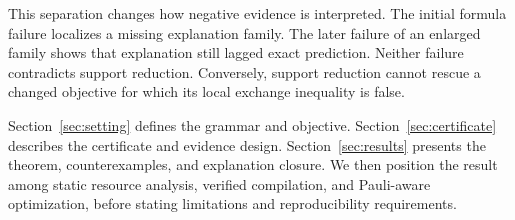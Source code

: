 This separation changes how negative evidence is interpreted. The initial formula failure localizes a missing explanation family. The later failure of an enlarged family shows that explanation still lagged exact prediction. Neither failure contradicts support reduction. Conversely, support reduction cannot rescue a changed objective for which its local exchange inequality is false.

Section~\ref{sec:setting} defines the grammar and objective. Section~\ref{sec:certificate} describes the certificate and evidence design. Section~\ref{sec:results} presents the theorem, counterexamples, and explanation closure. We then position the result among static resource analysis, verified compilation, and Pauli-aware optimization, before stating limitations and reproducibility requirements.

